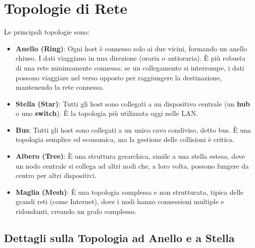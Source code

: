 \section{Topologie di Rete}


Le principali topologie sono:
\begin{itemize}
    \item \textbf{Anello (Ring)}: Ogni host è connesso solo ai due vicini, formando un anello chiuso. I dati viaggiano in una direzione (oraria o antioraria). È più robusta di una rete minimamente connessa: se un collegamento si interrompe, i dati possono viaggiare nel verso opposto per raggiungere la destinazione, mantenendo la rete connessa.
    \item \textbf{Stella (Star)}: Tutti gli host sono collegati a un dispositivo centrale (un \textbf{hub} o uno \textbf{switch}). È la topologia più utilizzata oggi nelle LAN.
    \item \textbf{Bus}: Tutti gli host sono collegati a un unico cavo condiviso, detto bus. È una topologia semplice ed economica, ma la gestione delle collisioni è critica.
    \item \textbf{Albero (Tree)}: È una struttura gerarchica, simile a una stella estesa, dove un nodo centrale si collega ad altri nodi che, a loro volta, possono fungere da centro per altri dispositivi.
    \item \textbf{Maglia (Mesh)}: È una topologia complessa e non strutturata, tipica delle grandi reti (come Internet), dove i nodi hanno connessioni multiple e ridondanti, creando un grafo complesso.
\end{itemize}

\subsection{Dettagli sulla Topologia ad Anello e a Stella}

